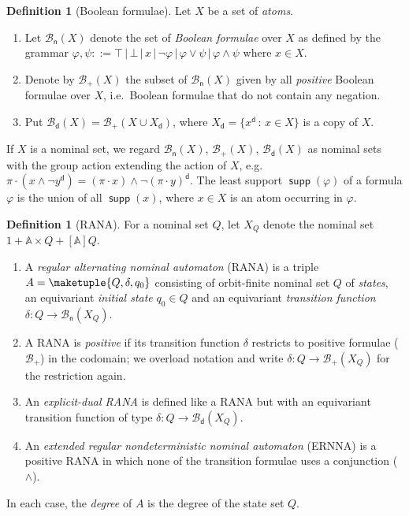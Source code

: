 \documentclass[10pt,a4paper]{amsart}
\theoremstyle{definition}
\newtheorem{defn}[theo]{Definition}
\newcommand{\At}{\mathds{A}}
\newcommand{\allbool}{\mathcal{B}}
\newcommand{\posbool}{\allbool_+}
\newcommand{\negsym}{\mathsf{n}}
\newcommand{\negbool}{\allbool_{\negsym}}
\newcommand{\dualbool}{\allbool_\mathsf{d}}
\newcommand{\dual}[1]{{#1}^\mathsf{d}}
\DeclareMathOperator{\supp}{\mathsf{supp}}
\newcommand{\names}{\At}
\newcommand{\Abstr}[2][\names]{[#1]#2}
\renewcommand{\phi}{\varphi}
\newcommand{\setw}[2]{\{#1\,:\,#2\}}
\begin{document}
\begin{defn}[Boolean formulae]\label{defn:boolform}
Let $X$ be a set of \emph{atoms}.
  \begin{enumerate}%
    \item Let $\negbool(X)$ denote
      the set of \emph{Boolean formulae} over $X$ as defined by
      the grammar $\varphi,\psi ::= \top\,\vert\,\bot\,\vert\,x\,\vert\,
      \neg\varphi\,\vert\,\varphi\vee\psi\,\vert\,\varphi\wedge\psi$ where $x\in X$. 
    \item Denote by $\posbool(X)$ the subset of
      $\negbool(X)$ given by all \emph{positive}
      Boolean formulae over $X$, i.e.~Boolean formulae that
      do not contain any negation.
    \item Put $\dualbool(X) = \posbool(X \cup X_\mathsf{d})$,
        where $X_\mathsf{d} = \setw{\dual{x}}{x \in X}$ is a copy of $X$.
    \end{enumerate}
If $X$ is a nominal set, we regard $\negbool(X)$, $\posbool(X)$, $\dualbool(X)$ as nominal sets with the group action extending the action of $X$, e.g.~$\pi\cdot (x\wedge \neg \dual{y}) = (\pi\cdot x)\wedge \neg \dual{(\pi\cdot y)}$.  The least support $\supp(\varphi)$ of a formula $\varphi$ is the union of all $\supp(x)$, where $x\in X$ is an atom occurring in $\phi$. 
\end{defn}
\begin{defn}[RANA]\label{defn:rana}
  For a nominal set $Q$, let $X_Q$ denote the nominal set $1 + \names \times Q + \Abstr{Q}$.
  \begin{enumerate}
    \item A \emph{regular alternating nominal automaton} (RANA) is a triple $A = \maketuple{Q,
        \delta, q_0}$ consisting of
      orbit-finite nominal set $Q$ of \emph{states}, an equivariant \emph{initial state} $q_0 \in Q$ and an equivariant
      \emph{transition function} $\delta \colon Q \to \negbool(X_Q)$.
    \item A RANA is \emph{positive} if its transition function $\delta$ restricts to positive formulae ($\posbool$) in
      the codomain; we overload notation and write $\delta\colon Q \to \posbool(X_Q)$ for the restriction again.
    \item An \emph{explicit-dual RANA} is defined like a RANA but with an equivariant transition function of type
      $\delta\colon Q \to \dualbool(X_Q)$.
    \item An \emph{extended regular nondeterministic nominal automaton} (ERNNA) is a positive RANA in which none of the
      transition formulae uses a conjunction ($\land$).
  \end{enumerate}
In each case, the \emph{degree} of $A$ is the degree of the state set $Q$. 
\end{defn}
\end{document}
